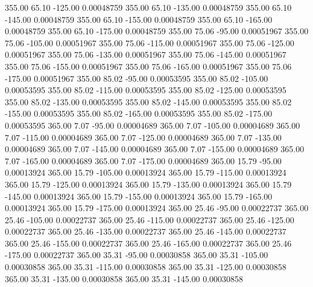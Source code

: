     355.00     65.10   -125.00     0.00048759
    355.00     65.10   -135.00     0.00048759
    355.00     65.10   -145.00     0.00048759
    355.00     65.10   -155.00     0.00048759
    355.00     65.10   -165.00     0.00048759
    355.00     65.10   -175.00     0.00048759
    355.00     75.06    -95.00     0.00051967
    355.00     75.06   -105.00     0.00051967
    355.00     75.06   -115.00     0.00051967
    355.00     75.06   -125.00     0.00051967
    355.00     75.06   -135.00     0.00051967
    355.00     75.06   -145.00     0.00051967
    355.00     75.06   -155.00     0.00051967
    355.00     75.06   -165.00     0.00051967
    355.00     75.06   -175.00     0.00051967
    355.00     85.02    -95.00     0.00053595
    355.00     85.02   -105.00     0.00053595
    355.00     85.02   -115.00     0.00053595
    355.00     85.02   -125.00     0.00053595
    355.00     85.02   -135.00     0.00053595
    355.00     85.02   -145.00     0.00053595
    355.00     85.02   -155.00     0.00053595
    355.00     85.02   -165.00     0.00053595
    355.00     85.02   -175.00     0.00053595
    365.00      7.07    -95.00     0.00004689
    365.00      7.07   -105.00     0.00004689
    365.00      7.07   -115.00     0.00004689
    365.00      7.07   -125.00     0.00004689
    365.00      7.07   -135.00     0.00004689
    365.00      7.07   -145.00     0.00004689
    365.00      7.07   -155.00     0.00004689
    365.00      7.07   -165.00     0.00004689
    365.00      7.07   -175.00     0.00004689
    365.00     15.79    -95.00     0.00013924
    365.00     15.79   -105.00     0.00013924
    365.00     15.79   -115.00     0.00013924
    365.00     15.79   -125.00     0.00013924
    365.00     15.79   -135.00     0.00013924
    365.00     15.79   -145.00     0.00013924
    365.00     15.79   -155.00     0.00013924
    365.00     15.79   -165.00     0.00013924
    365.00     15.79   -175.00     0.00013924
    365.00     25.46    -95.00     0.00022737
    365.00     25.46   -105.00     0.00022737
    365.00     25.46   -115.00     0.00022737
    365.00     25.46   -125.00     0.00022737
    365.00     25.46   -135.00     0.00022737
    365.00     25.46   -145.00     0.00022737
    365.00     25.46   -155.00     0.00022737
    365.00     25.46   -165.00     0.00022737
    365.00     25.46   -175.00     0.00022737
    365.00     35.31    -95.00     0.00030858
    365.00     35.31   -105.00     0.00030858
    365.00     35.31   -115.00     0.00030858
    365.00     35.31   -125.00     0.00030858
    365.00     35.31   -135.00     0.00030858
    365.00     35.31   -145.00     0.00030858
